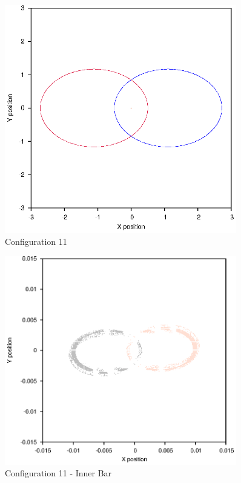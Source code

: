 \documentclass[a4paper,12pt]{article}
\begin{document}
\begin{figure}[H]
\centering
\includegraphics[width=0.9\textwidth]{./results/01-7-01-2/Orbit.eps}
\caption{Configuration 11}
\label{fig:config11}
\end{figure}
\begin{figure}[H]
\centering
\includegraphics[width=0.9\textwidth]{./results/01-7-01-2/Inner.eps}
\caption{Configuration 11 - Inner Bar}
\label{fig:config11i}
\end{figure}
\end{document}
